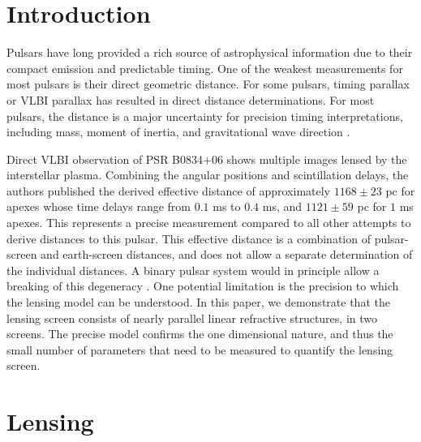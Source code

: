 \documentclass[useAMS,usenatbib]{mn2e}
\begin{document}
\newcommand{\be}{\begin{eqnarray}}
\newcommand{\ee}{\end{eqnarray}}
\newcommand{\beq}{\begin{equation}}
\newcommand{\eeq}{\end{equation}}

\section{Introduction}

Pulsars have long provided a rich source of astrophysical information
due to their compact emission and predictable timing. One of the
weakest measurements for most pulsars is their direct geometric
distance.  For some pulsars, timing parallax or VLBI parallax has
resulted in direct distance determinations.  For most pulsars, the
distance is a major uncertainty for precision timing interpretations,
including mass, moment of inertia, and gravitational wave
direction \citep{boyle2012}.

Direct VLBI observation of PSR B0834+06 shows multiple images lensed
by the interstellar plasma.  Combining the angular positions and
scintillation delays, the authors published the derived effective
distance \citep{2010ApJ...708..232B} of approximately $1168\pm 23$ pc
for apexes whose time delays range from $0.1$ ms to $0.4$ ms, and
$1121\pm 59$ pc for $1$ ms apexes.  This represents a precise
measurement compared to all other attempts to derive distances to this
pulsar.  This effective distance is a combination of pulsar-screen and
earth-screen distances, and does not allow a separate determination of
the individual distances.  A binary pulsar system would in principle
allow a breaking of this degeneracy \citep{2014MNRAS.442.3338P}. One
potential limitation is the precision to which the lensing model can
be understood.  In this paper, we demonstrate that the lensing screen
consists of nearly parallel linear refractive structures, in two
screens.  The precise model confirms the one dimensional nature, and
thus the small number of parameters that need to be measured to
quantify the lensing screen. 

\section{Lensing}
\end{document}
